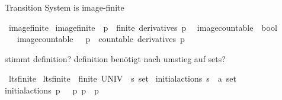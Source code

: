 \begin{isabellebody}
\begin{isamarkuptext}%
Transition System is image-finite%
\end{isamarkuptext}\isamarkuptrue%
\isamarkupfalse%
\ image{\isacharunderscore}{\kern0pt}finite\ \isanewline
{\isacartoucheopen}image{\isacharunderscore}{\kern0pt}finite\ {\isasymequiv}\ {\isacharparenleft}{\kern0pt}{\isasymforall}p\ {\isasymalpha}{\isachardot}{\kern0pt}\ finite\ {\isacharparenleft}{\kern0pt}derivatives\ p\ {\isasymalpha}{\isacharparenright}{\kern0pt}{\isacharparenright}{\kern0pt}{\isacartoucheclose}\isanewline
\isanewline
{}\isamarkupfalse%
\ image{\isacharunderscore}{\kern0pt}countable\ {\isacharcolon}{\kern0pt}{\isacharcolon}{\kern0pt}\ {\isacartoucheopen}bool{\isacartoucheclose}\isanewline
\ \ \ {\isacartoucheopen}image{\isacharunderscore}{\kern0pt}countable\ {\isasymequiv}\ {\isacharparenleft}{\kern0pt}{\isasymforall}\ p\ {\isasymalpha}{\isachardot}{\kern0pt}\ countable\ {\isacharparenleft}{\kern0pt}derivatives\ p\ {\isasymalpha}{\isacharparenright}{\kern0pt}{\isacharparenright}{\kern0pt}{\isacartoucheclose}%
\begin{isamarkuptext}%
stimmt definition? definition benötigt nach umstieg auf sets?%
\end{isamarkuptext}\isamarkuptrue%
\isamarkupfalse%
\ lts{\isacharunderscore}{\kern0pt}finite\ \isanewline
{\isacartoucheopen}lts{\isacharunderscore}{\kern0pt}finite\ {\isasymequiv}\ {\isacharparenleft}{\kern0pt}finite\ {\isacharparenleft}{\kern0pt}UNIV\ {\isacharcolon}{\kern0pt}{\isacharcolon}{\kern0pt}\ {\isacharprime}{\kern0pt}s\ set{\isacharparenright}{\kern0pt}{\isacharparenright}{\kern0pt}{\isacartoucheclose}\isanewline
\isanewline
{}\isamarkupfalse%
\ initial{\isacharunderscore}{\kern0pt}actions{\isacharcolon}{\kern0pt}{\isacharcolon}{\kern0pt}\ {\isacartoucheopen}{\isacharprime}{\kern0pt}s\ {\isasymRightarrow}\ {\isacharprime}{\kern0pt}a\ set{\isacartoucheclose}\isanewline
\ \ \isanewline
{\isacartoucheopen}initial{\isacharunderscore}{\kern0pt}actions\ p\ {\isasymequiv}\ {\isacharbraceleft}{\kern0pt}{\isasymalpha}{\isacharbar}{\kern0pt}{\isasymalpha}{\isachardot}{\kern0pt}\ {\isacharparenleft}{\kern0pt}{\isasymexists}p{\isacharprime}{\kern0pt}{\isachardot}{\kern0pt}\ p\ {\isasymmapsto}{\isasymalpha}\ p{\isacharprime}{\kern0pt}{\isacharparenright}{\kern0pt}{\isacharbraceright}{\kern0pt}{\isacartoucheclose}\isanewline
\isanewline
{}\isamarkupfalse%

\end{isabellebody}
